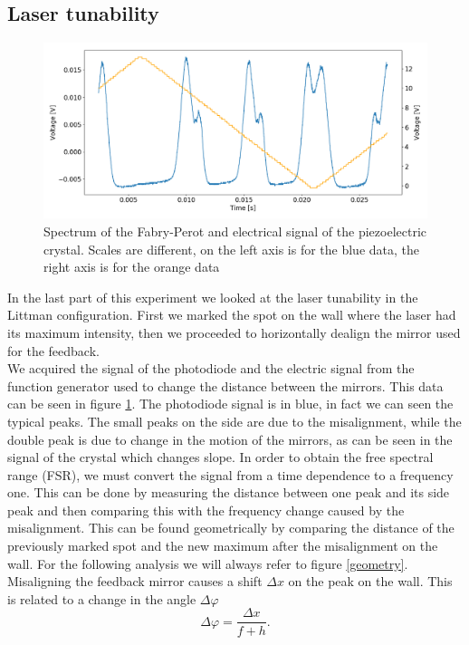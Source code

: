 \documentclass[a4paper,10pt]{article}
\begin{document}
\subsection{Laser tunability}
\begin{figure}[H]
\centering
\includegraphics[width=\textwidth]{fabryperot.png}
\caption{Spectrum of the Fabry-Perot and electrical signal of the piezoelectric crystal. Scales are different, on the left axis is for the blue data, the right axis is for the orange data}\label{fabryperot}
\end{figure}
In the last part of this experiment we looked at the laser tunability in the Littman configuration. First we marked the spot on the wall where the laser had its maximum intensity, then we proceeded to horizontally dealign the mirror used for the feedback.\\
We acquired the signal of the photodiode and the electric signal from the function generator used to change the distance between the mirrors. This data can be seen in figure \ref{fabryperot}. The photodiode signal is in blue, in fact we can seen the typical peaks. The small peaks on the side are due to the misalignment, while the double peak is due to change in the motion of the mirrors, as can be seen in the signal of the crystal which changes slope. In order to obtain the free spectral range (FSR), we must convert the signal from a time dependence to a frequency one. This can be done by measuring the distance between one peak and its side peak and then comparing this with the frequency change caused by the misalignment. This can be found geometrically by comparing the distance of the previously marked spot and the new maximum after the misalignment on the wall. For the following analysis we will always refer to figure \ref{geometry}. Misaligning the feedback mirror causes a shift $\Delta x$ on the peak on the wall. This is related to a change in the angle $\Delta \varphi$
\[\Delta \varphi = \frac{\Delta x}{f+h}.\]
\end{document}
